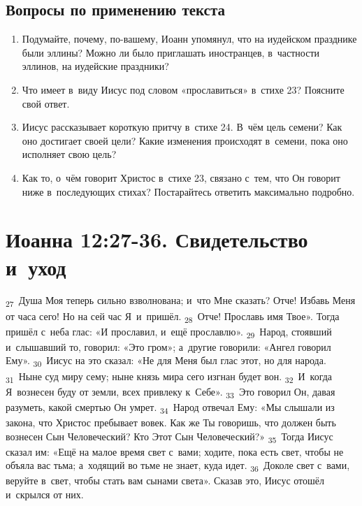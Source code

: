 \documentclass[a4paper,12pt]{article}
\begin{document}
\subsection*{Вопросы по применению текста} 
\begin{enumerate}
    \item Подумайте, почему, по-вашему, Иоанн упомянул, что на иудейском празднике были эллины? Можно ли было приглашать иностранцев, в~частности эллинов, на иудейские праздники?
    
    \myline
    
    \myline
    \item Что имеет в~виду Иисус под словом «прославиться» в~стихе 23? Поясните свой ответ. 
    
    \myline
    
    \myline
    \item Иисус рассказывает короткую притчу в~стихе 24. В~чём цель семени? Как оно достигает своей цели? Какие изменения происходят в~семени, пока оно исполняет свою цель? 
    
    \myline
    
    \myline
    \item Как то, о~чём говорит Христос в~стихе 23, связано с~тем, что Он говорит ниже в~последующих стихах? Постарайтесь ответить максимально подробно. 
    
    \myline
    
    \myline
\end{enumerate}



\section{Иоанна 12:27-36. Свидетельство и~уход}

\textsubscript{27}~Душа Моя теперь сильно взволнована; и~что Мне сказать? Отче! Избавь Меня от часа сего! Но на сей час Я~и~пришёл.
\textsubscript{28}~Отче! Прославь имя Твое». Тогда пришёл с~неба глас: «И прославил, и~ещё прославлю».
\textsubscript{29}~Народ, стоявший и~слышавший то, говорил: «Это гром»; а~другие говорили: «Ангел говорил Ему».
\textsubscript{30}~Иисус на это сказал: «Не для Меня был глас этот, но для народа.
\textsubscript{31}~Ныне суд миру сему; ныне князь мира сего изгнан будет вон.
\textsubscript{32}~И~когда Я~вознесен буду от земли, всех привлеку к~Себе».
\textsubscript{33}~Это говорил Он, давая разуметь, какой смертью Он умрет.
\textsubscript{34}~Народ отвечал Ему: «Мы слышали из закона, что Христос пребывает вовек. Как же Ты говоришь, что должен быть вознесен Сын Человеческий? Кто Этот Сын Человеческий?»
\textsubscript{35}~Тогда Иисус сказал им: «Ещё на малое время свет с~вами; ходите, пока есть свет, чтобы не объяла вас тьма; а~ходящий во тьме не знает, куда идет.
\textsubscript{36}~Доколе свет с~вами, веруйте в~свет, чтобы стать вам сынами света». Сказав это, Иисус отошёл и~скрылся от них. 
\end{document}
